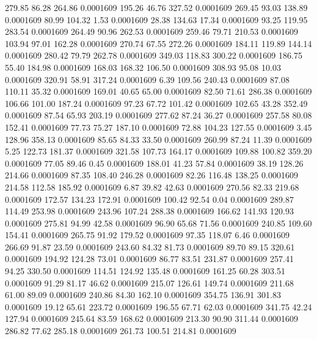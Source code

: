  279.85   86.28  264.86   0.0001609
 195.26   46.76  327.52   0.0001609
 269.45   93.03  138.89   0.0001609
  80.99  104.32    1.53   0.0001609
  28.38  134.63   17.34   0.0001609
  93.25  119.95  283.54   0.0001609
 264.49   90.96  262.53   0.0001609
 259.46   79.71  210.53   0.0001609
 103.94   97.01  162.28   0.0001609
 270.74   67.55  272.26   0.0001609
 184.11  119.89  144.14   0.0001609
 280.42   79.79  262.78   0.0001609
 349.03  118.83  300.22   0.0001609
 186.75   55.40  184.98   0.0001609
 168.03  168.32  106.50   0.0001609
 308.93   95.08   10.03   0.0001609
 320.91   58.91  317.24   0.0001609
   6.39  109.56  240.43   0.0001609
  87.08  110.11   35.32   0.0001609
 169.01   40.65   65.00   0.0001609
  82.50   71.61  286.38   0.0001609
 106.66  101.00  187.24   0.0001609
  97.23   67.72  101.42   0.0001609
 102.65   43.28  352.49   0.0001609
  87.54   65.93  203.19   0.0001609
 277.62   87.24   36.27   0.0001609
 257.58   80.08  152.41   0.0001609
  77.73   75.27  187.10   0.0001609
  72.88  104.23  127.55   0.0001609
   3.45  128.96  358.13   0.0001609
  85.65   84.33   33.50   0.0001609
 260.99   87.24   11.39   0.0001609
   5.25  122.73  181.37   0.0001609
 321.58  107.73  164.17   0.0001609
 109.88  100.82  359.20   0.0001609
  77.05   89.46    0.45   0.0001609
 188.01   41.23   57.84   0.0001609
  38.19  128.26  214.66   0.0001609
  87.35  108.40  246.28   0.0001609
  82.26  116.48  138.25   0.0001609
 214.58  112.58  185.92   0.0001609
   6.87   39.82   42.63   0.0001609
 270.56   82.33  219.68   0.0001609
 172.57  134.23  172.91   0.0001609
 100.42   92.54    0.04   0.0001609
 289.87  114.49  253.98   0.0001609
 243.96  107.24  288.38   0.0001609
 166.62  141.93  120.93   0.0001609
 275.81   94.99   42.58   0.0001609
  96.90   65.68   71.56   0.0001609
 240.85  109.60  154.41   0.0001609
 265.75   91.92  179.52   0.0001609
  97.35  118.07    6.46   0.0001609
 266.69   91.87   23.59   0.0001609
 243.60   84.32   81.73   0.0001609
  89.70   89.15  320.61   0.0001609
 194.92  124.28   73.01   0.0001609
  86.77   83.51  231.87   0.0001609
 257.41   94.25  330.50   0.0001609
 114.51  124.92  135.48   0.0001609
 161.25   60.28  303.51   0.0001609
  91.29   81.17   46.62   0.0001609
 215.07  126.61  149.74   0.0001609
 211.68   61.00   89.09   0.0001609
 240.86   84.30  162.10   0.0001609
 354.75  136.91  301.83   0.0001609
  19.12   65.61  223.72   0.0001609
 196.55   67.71   62.03   0.0001609
 341.75   42.24  127.94   0.0001609
 245.64   83.59  168.62   0.0001609
 213.30   90.90  311.44   0.0001609
 286.82   77.62  285.18   0.0001609
 261.73  100.51  214.81   0.0001609
